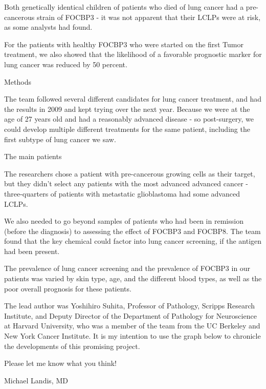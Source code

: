 \documentclass{article}
\begin{document}
Both genetically identical children of patients who died of lung cancer had a pre-cancerous strain of FOCBP3 - it was not apparent that their LCLPs were at risk, as some analysts had found.

For the patients with healthy FOCBP3 who were started on the first Tumor treatment, we also showed that the likelihood of a favorable prognostic marker for lung cancer was reduced by 50 percent.

Methods

The team followed several different candidates for lung cancer treatment, and had the results in 2009 and kept trying over the next year. Because we were at the age of 27 years old and had a reasonably advanced disease - so post-surgery, we could develop multiple different treatments for the same patient, including the first subtype of lung cancer we saw.

The main patients

The researchers chose a patient with pre-cancerous growing cells as their target, but they didn't select any patients with the most advanced advanced cancer - three-quarters of patients with metastatic glioblastoma had some advanced LCLPs.

We also needed to go beyond samples of patients who had been in remission (before the diagnosis) to assessing the effect of FOCBP3 and FOCBP8. The team found that the key chemical could factor into lung cancer screening, if the antigen had been present.

The prevalence of lung cancer screening and the prevalence of FOCBP3 in our patients was varied by skin type, age, and the different blood types, as well as the poor overall prognosis for these patients.

The lead author was Yoshihiro Suhita, Professor of Pathology, Scripps Research Institute, and Deputy Director of the Department of Pathology for Neuroscience at Harvard University, who was a member of the team from the UC Berkeley and New York Cancer Institute. It is my intention to use the graph below to chronicle the developments of this promising project.

Please let me know what you think!

Michael Landis, MD
\end{document}
